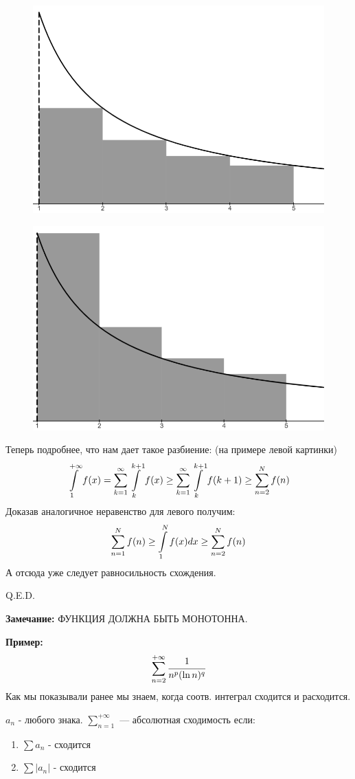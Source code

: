 \begin{figure}[h!]
    \centering
    \begin{minipage}{0.45\textwidth}
        \centering
        \includegraphics[width = 7 cm]{assets/series-left.png}
         \label{fig:image1}
    \end{minipage}
    \hfill
    \begin{minipage}{0.45\textwidth}
        \centering
        \includegraphics[width = 7 cm]{assets/series-right.png}
         \label{fig:image2}
    \end{minipage}
\end{figure}
Теперь подробнее, что нам дает такое разбиение: (на примере левой картинки)
$$\displaystyle\int\limits_{1}^{+\infty}f(x) = \sum\limits_{k=1}^\infty \displaystyle\int\limits_{k}^{k+1}f(x)\geq \sum\limits_{k=1}^\infty \displaystyle\int\limits_{k}^{k+1}f(k+1) \geq \sum\limits_{n=2}^{N}f(n) $$
Доказав аналогичное неравенство для левого получим:
$$\sum\limits_{n=1}^{N} f(n)\geq \displaystyle\int\limits_{1}^{N} f(x) dx\geq \sum\limits_{n=2}^{N}f(n)$$
А отсюда уже следует равносильность схождения.

\hfill Q.E.D.

\textbf{Замечание:}  ФУНКЦИЯ ДОЛЖНА  БЫТЬ МОНОТОННА.

\textbf{Пример:} 
$$\sum\limits_{n=2}^{+\infty} \cfrac{1}{n^p (\ln n)^q}$$
Как мы показывали ранее мы знаем, когда соотв. интеграл сходится и расходится.



$a_n$ - любого знака. $\sum\limits_{n=1}^{+\infty}$ --- абсолютная сходимость если:
\begin{enumerate}
    \item $\sum a_n$ - сходится
    \item $\sum |a_n|$ - сходится
\end{enumerate}

